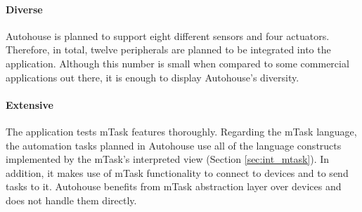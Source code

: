 \paragraph{Diverse} Autohouse is planned to support eight different sensors and four actuators. Therefore, in total, twelve peripherals are planned to be integrated into the application. Although this number is small when compared to some commercial applications out there, it is enough to display Autohouse's diversity.

\paragraph{Extensive} The application tests \gls{mTask} features thoroughly. Regarding the \gls{mTask} language, the automation tasks planned in Autohouse use all of the language constructs implemented by the \gls{mTask}'s interpreted view (Section \ref{sec:int_mtask}). In addition, it makes use of \gls{mTask} functionality to connect to devices and to send tasks to it. Autohouse benefits from \gls{mTask} abstraction layer over devices and does not handle them directly.

